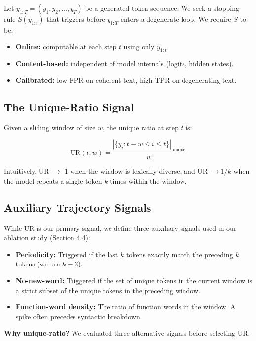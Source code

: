 \documentclass[11pt]{article}
\begin{document}
Let $y_{1:T} = (y_1, y_2, \dots, y_T)$ be a generated token sequence. We seek a stopping rule $S(y_{1:t})$ that triggers before $y_{1:T}$ enters a degenerate loop. We require $S$ to be:

\begin{itemize}
    \item \textbf{Online:} computable at each step $t$ using only $y_{1:t}$.
    \item \textbf{Content-based:} independent of model internals (logits, hidden states).
    \item \textbf{Calibrated:} low FPR on coherent text, high TPR on degenerating text.
\end{itemize}

\subsection{The Unique-Ratio Signal}

Given a sliding window of size $w$, the unique ratio at step $t$ is:

$$
\text{UR}(t; w) = \frac{|\{y_i : t - w \le i \le t\}|_{\text{unique}}}{w}
$$

Intuitively, UR $\to$ 1 when the window is lexically diverse, and UR $\to 1/k$ when the model repeats a single token $k$ times within the window.

\subsection{Auxiliary Trajectory Signals}
While UR is our primary signal, we define three auxiliary signals used in our ablation study (Section 4.4):
\begin{itemize}
    \item \textbf{Periodicity:} Triggered if the last $k$ tokens exactly match the preceding $k$ tokens (we use $k=3$).
    \item \textbf{No-new-word:} Triggered if the set of unique tokens in the current window is a strict subset of the unique tokens in the preceding window.
    \item \textbf{Function-word density:} The ratio of function words in the window. A spike often precedes syntactic breakdown.
\end{itemize}

\textbf{Why unique-ratio?} We evaluated three alternative signals before selecting UR:
\end{document}
